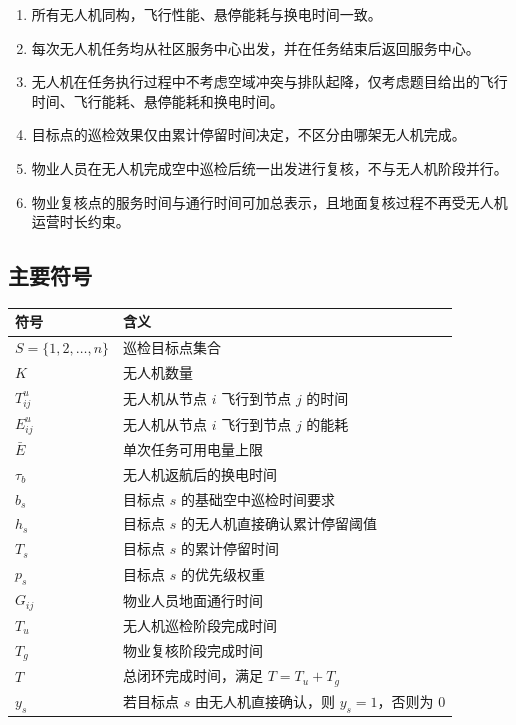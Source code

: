 \documentclass[12pt]{article}
\begin{document}
\begin{enumerate}
	\item 所有无人机同构，飞行性能、悬停能耗与换电时间一致。
	\item 每次无人机任务均从社区服务中心出发，并在任务结束后返回服务中心。
	\item 无人机在任务执行过程中不考虑空域冲突与排队起降，仅考虑题目给出的飞行时间、飞行能耗、悬停能耗和换电时间。
	\item 目标点的巡检效果仅由累计停留时间决定，不区分由哪架无人机完成。
	\item 物业人员在无人机完成空中巡检后统一出发进行复核，不与无人机阶段并行。
	\item 物业复核点的服务时间与通行时间可加总表示，且地面复核过程不再受无人机运营时长约束。
\end{enumerate}

\subsection{主要符号}

\begin{table}[H]
\centering
\begin{tabular}{>{\raggedright\arraybackslash}p{3cm} >{\raggedright\arraybackslash}p{9.5cm}}
\toprule
符号 & 含义 \\
\midrule
$S=\{1,2,\dots,n\}$ & 巡检目标点集合 \\
$K$ & 无人机数量 \\
$T_{ij}^{u}$ & 无人机从节点 $i$ 飞行到节点 $j$ 的时间 \\
$E_{ij}^{u}$ & 无人机从节点 $i$ 飞行到节点 $j$ 的能耗 \\
$\bar{E}$ & 单次任务可用电量上限 \\
$\tau_b$ & 无人机返航后的换电时间 \\
$b_s$ & 目标点 $s$ 的基础空中巡检时间要求 \\
$h_s$ & 目标点 $s$ 的无人机直接确认累计停留阈值 \\
$T_s$ & 目标点 $s$ 的累计停留时间 \\
$p_s$ & 目标点 $s$ 的优先级权重 \\
$G_{ij}$ & 物业人员地面通行时间 \\
$T_u$ & 无人机巡检阶段完成时间 \\
$T_g$ & 物业复核阶段完成时间 \\
$T$ & 总闭环完成时间，满足 $T=T_u+T_g$ \\
$y_s$ & 若目标点 $s$ 由无人机直接确认，则 $y_s=1$，否则为 0 \\
\bottomrule
\end{tabular}
\end{table}
\end{document}
